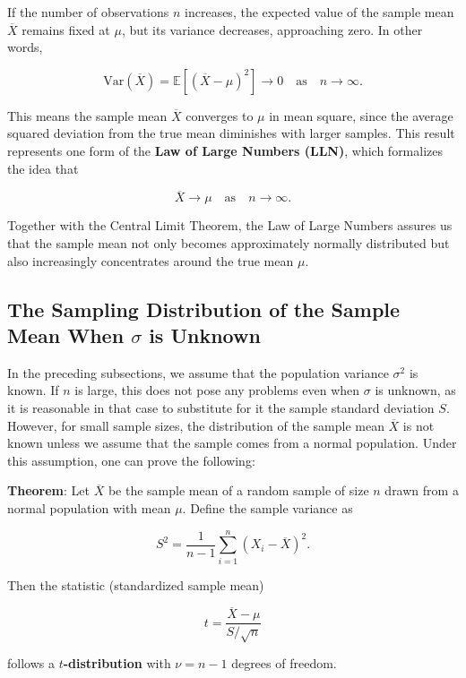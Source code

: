 \documentclass[twoside]{book}
\begin{document}
If the number of observations \( n \) increases, the expected value of the sample mean \( \overline{X} \) remains fixed at \( \mu \), but its variance decreases, approaching zero. In other words,

\[
\mathrm{Var}(\overline{X}) = \mathbb{E}\left[(\overline{X} - \mu)^2\right] \to 0 \quad \text{as} \quad n \to \infty.
\]

This means the sample mean \( \overline{X} \) converges to \( \mu \) in mean square, since the average squared deviation from the true mean diminishes with larger samples. This result represents one form of the \textbf{Law of Large Numbers (LLN)}, which formalizes the idea that

\[
\overline{X} \to \mu \quad \text{as} \quad n \to \infty.
\]

Together with the Central Limit Theorem, the Law of Large Numbers assures us that the sample mean not only becomes approximately normally distributed but also increasingly concentrates around the true mean \( \mu \).

\subsection{The Sampling Distribution of the Sample Mean When $\sigma$ is Unknown}
In the preceding subsections, we assume that the population variance $\sigma^2$ is known. If $n$ is large, this does not pose any problems even when $\sigma$ is unknown, as it is reasonable in that case to substitute for it the sample standard deviation $S$. However, for small sample sizes, the distribution of the sample mean $\overline{X}$ is not known unless we assume that the  sample comes from a normal population. Under this assumption, one can prove the following:

\begin{textbox}
\textbf{Theorem}: Let \( \overline{X} \) be the sample mean of a random sample of size \( n \) drawn from a normal population with mean \( \mu \). Define the sample variance as

\[
S^2 = \frac{1}{n - 1} \sum_{i=1}^n (X_i - \overline{X})^2.
\]

Then the statistic (standardized sample mean)

\[
t = \frac{\overline{X} - \mu}{S / \sqrt{n}}
\]

follows a $ t $\textbf{-distribution} with \( \nu = n - 1 \) degrees of freedom.

\end{textbox}
\end{document}
